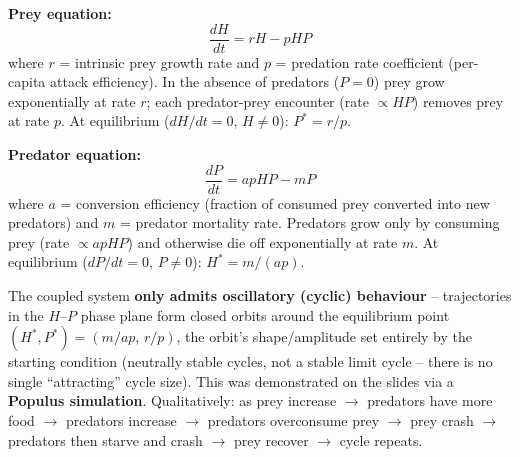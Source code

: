 \documentclass[11pt,a4paper]{article}
\begin{document}
\textbf{Prey equation:}
\[
\frac{dH}{dt} = rH - pHP
\]
where $r$ = intrinsic prey growth rate and $p$ = predation rate coefficient (per-capita attack efficiency). In the absence of predators ($P=0$) prey grow exponentially at rate $r$; each predator-prey encounter (rate $\propto HP$) removes prey at rate $p$. At equilibrium ($dH/dt = 0$, $H\neq0$): $P^{*} = r/p$.

\textbf{Predator equation:}
\[
\frac{dP}{dt} = apHP - mP
\]
where $a$ = conversion efficiency (fraction of consumed prey converted into new predators) and $m$ = predator mortality rate. Predators grow only by consuming prey (rate $\propto apHP$) and otherwise die off exponentially at rate $m$. At equilibrium ($dP/dt=0$, $P\neq0$): $H^{*} = m/(ap)$.

\begin{keybox}[title=Combined behaviour]
The coupled system \textbf{only admits oscillatory (cyclic) behaviour} -- trajectories in the $H$--$P$ phase plane form closed orbits around the equilibrium point $(H^{*},P^{*}) = (m/ap,\, r/p)$, the orbit's shape/amplitude set entirely by the starting condition (neutrally stable cycles, not a stable limit cycle -- there is no single ``attracting'' cycle size). This was demonstrated on the slides via a \textbf{Populus simulation}. Qualitatively: as prey increase $\to$ predators have more food $\to$ predators increase $\to$ predators overconsume prey $\to$ prey crash $\to$ predators then starve and crash $\to$ prey recover $\to$ cycle repeats.
\end{keybox}
\end{document}
